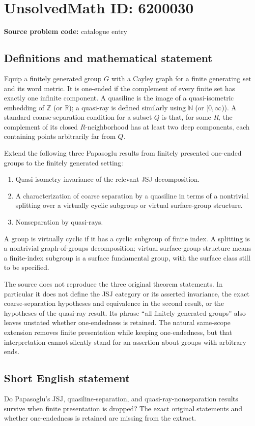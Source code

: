 \documentclass[11pt]{article}
\begin{document}
\section*{UnsolvedMath ID: 6200030}
\textbf{Source problem code:} catalogue entry
\subsection{Definitions and mathematical statement}
Equip a finitely generated group $G$ with a Cayley graph for a finite generating set and its word metric. It is one-ended if the complement of every finite set has exactly one infinite component. A quasiline is the image of a quasi-isometric embedding of $\mathbb Z$ (or $\mathbb R$); a quasi-ray is defined similarly using $\mathbb N$ (or $[0,\infty)$). A standard coarse-separation condition for a subset $Q$ is that, for some $R$, the complement of its closed $R$-neighborhood has at least two deep components, each containing points arbitrarily far from $Q$.

Extend the following three Papasoglu results from finitely presented one-ended groups to the finitely generated setting:
\begin{enumerate}
\item Quasi-isometry invariance of the relevant JSJ decomposition.
\item A characterization of coarse separation by a quasiline in terms of a nontrivial splitting over a virtually cyclic subgroup or virtual surface-group structure.
\item Nonseparation by quasi-rays.
\end{enumerate}
A group is virtually cyclic if it has a cyclic subgroup of finite index. A splitting is a nontrivial graph-of-groups decomposition; virtual surface-group structure means a finite-index subgroup is a surface fundamental group, with the surface class still to be specified.

The source does not reproduce the three original theorem statements. In particular it does not define the JSJ category or its asserted invariance, the exact coarse-separation hypotheses and equivalence in the second result, or the hypotheses of the quasi-ray result. Its phrase ``all finitely generated groups'' also leaves unstated whether one-endedness is retained. The natural same-scope extension removes finite presentation while keeping one-endedness, but that interpretation cannot silently stand for an assertion about groups with arbitrary ends.
\subsection{Short English statement}
Do Papasoglu's JSJ, quasiline-separation, and quasi-ray-nonseparation results survive when finite presentation is dropped? The exact original statements and whether one-endedness is retained are missing from the extract.
\end{document}
